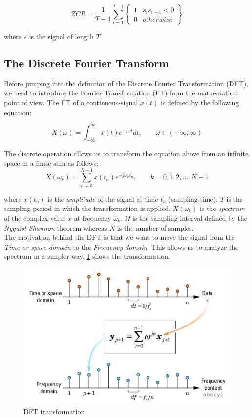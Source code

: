 \begin{equation}
ZCR = \frac{1}{T-1} \sum_{t=1}^{T-1} \begin{Bmatrix}
										1  & s_t s_{t-1} < 0 \\
										0 & otherwise
									 \end{Bmatrix}
\end{equation}

\noindent where $s$ is the signal of length $T$.

\subsection{The Discrete Fourier Transform}
\label{ssubs:discrete_fourier_transform}
Before jumping into the definition of the Discrete Fourier Transformation (DFT), we need to introduce the Fourier Transformation (FT) from the mathematical point of view. The FT of a continuous-signal $x(t)$ is defined by the following equation:

\begin{equation}
X(\omega) = \int_{-\infty}^\infty x(t)e^{-j\omega t} dt, \qquad \omega\in(-\infty,\infty)
\end{equation}

\noindent The discrete operation allows us to transform the equation above from an infinite space in a finite sum as follows:
\begin{equation}
X(\omega_k ) = \sum_{n=0}^{N-1}x(t_n)e^{-j\omega_k t_n}, \qquad k=0,1,2,\ldots,N-1
\end{equation}

\noindent where $x(t_n)$ is the \textit{amplitude} of the signal at time $t_n$ (sampling time). $T$ is the sampling period in which the transformation is applied. $X(\omega_k )$ is the \textit{spectrum} of the complex value $x$ at frequency $\omega_k$. $\Omega$ is the sampling interval defined by the \textit{Nyquist-Shannon} theorem whereas $N$ is the number of samples. \\

\noindent The motivation behind the DFT is that we want to move the signal from the \textit{Time or space domain} to the \textit{Frequency domain}. This allows us to analyze the spectrum in a simpler way. \ref{fig:dft} shows the transformation.

\begin{figure}[!ht]
	\centering
	\includegraphics[scale=0.7]{Figures/dft.png}
	\caption{DFT transformation \cite{dft_matlab}}
	\label{fig:dft}
\end{figure}
